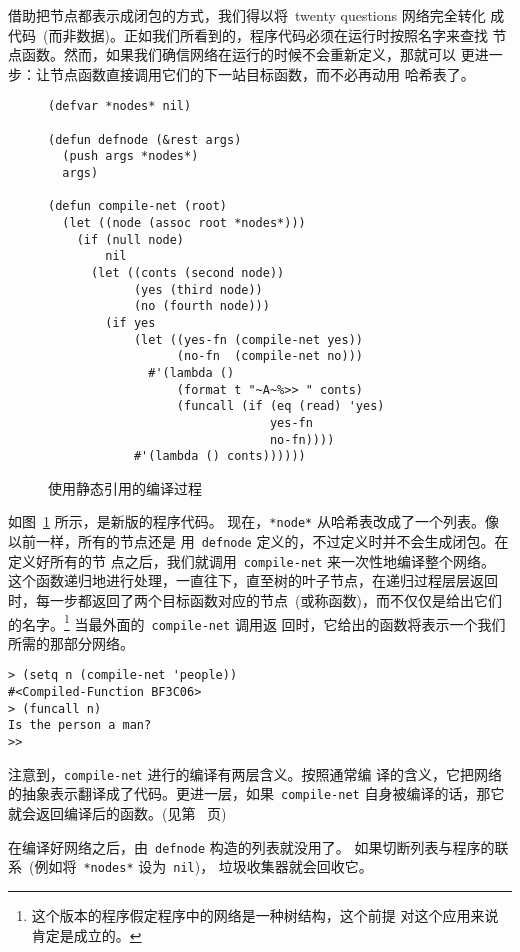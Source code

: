 借助把节点都表示成闭包的方式，我们得以将~twenty questions 网络完全转化
成代码~(而非数据)。正如我们所看到的，程序代码必须在运行时按照名字来查找
节点函数。然而，如果我们确信网络在运行的时候不会重新定义，那就可以
更进一步：让节点函数直接调用它们的下一站目标函数，而不必再动用
哈希表了。

\begin{figure}
\begin{lstlisting}
(defvar *nodes* nil)

(defun defnode (&rest args)
  (push args *nodes*)
  args)

(defun compile-net (root)
  (let ((node (assoc root *nodes*)))
    (if (null node)
        nil
      (let ((conts (second node))
            (yes (third node))
            (no (fourth node)))
        (if yes
            (let ((yes-fn (compile-net yes))
                  (no-fn  (compile-net no)))
              #'(lambda ()
                  (format t "~A~%>> " conts)
                  (funcall (if (eq (read) 'yes)
                               yes-fn
                               no-fn))))
            #'(lambda () conts))))))
\end{lstlisting}
  \caption{\label{fig:compilation_with_static_reference}使用静态引用的编译过程}
\end{figure}

如图~\ref{fig:compilation_with_static_reference} 所示，是新版的程序代码。
现在，\texttt{*node*} 从哈希表改成了一个列表。像以前一样，所有的节点还是
用~\texttt{defnode} 定义的，不过定义时并不会生成闭包。在定义好所有的节
点之后，我们就调用~\texttt{compile-net} 来一次性地编译整个网络。
这个函数递归地进行处理，一直往下，直至树的叶子节点，在递归过程层层返回
时，每一步都返回了两个目标函数对应的节点~(或称函数)，而不仅仅是给出它们
的名字。\footnote{这个版本的程序假定程序中的网络是一种树结构，这个前提
  对这个应用来说肯定是成立的。} 当最外面的~\texttt{compile-net} 调用返
回时，它给出的函数将表示一个我们所需的那部分网络。
\begin{lstlisting}
> (setq n (compile-net 'people))
#<Compiled-Function BF3C06>
> (funcall n)
Is the person a man?
>>
\end{lstlisting}
注意到，\texttt{compile-net} 进行的编译有两层含义。按照通常编
译的含义，它把网络的抽象表示翻译成了代码。更进一层，如果~\texttt{compile-net} 
自身被编译的话，那它就会返回编译后的函数。(见第~\pageref{page:compiled_function} 页)
\label{page:new-language-compiler}

在编译好网络之后，由~\texttt{defnode} 构造的列表就没用了。
如果切断列表与程序的联系~(例如将~\texttt{*nodes*} 设为~\texttt{nil})，
垃圾收集器就会回收它。


